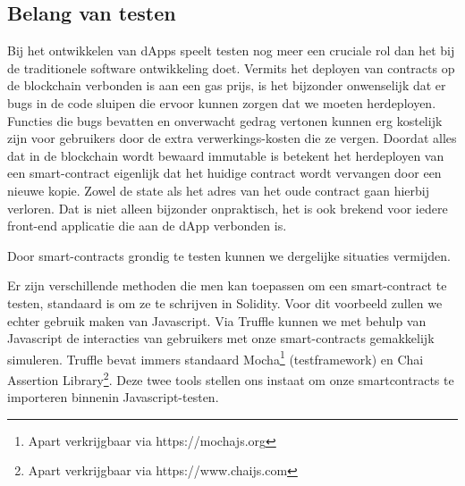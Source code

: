 	\subsection{Belang van testen}
	Bij het ontwikkelen van dApps speelt testen nog meer een cruciale rol  dan het bij de traditionele software ontwikkeling doet. Vermits het deployen van contracts op de blockchain verbonden is aan een gas prijs, is het bijzonder onwenselijk dat er bugs in de code sluipen die ervoor kunnen zorgen dat we moeten herdeployen. Functies die bugs bevatten en onverwacht gedrag vertonen kunnen erg kostelijk zijn voor gebruikers door de extra verwerkings-kosten die ze vergen. Doordat alles dat in de blockchain wordt bewaard immutable is betekent het herdeployen van een smart-contract eigenlijk dat het huidige contract wordt vervangen door een nieuwe kopie. Zowel de state als het adres van het oude contract gaan hierbij verloren. Dat is niet alleen bijzonder onpraktisch, het is ook brekend voor iedere front-end applicatie die aan de dApp verbonden is. 
	
	Door smart-contracts grondig te testen kunnen we dergelijke situaties vermijden.
	
	Er zijn verschillende methoden die men kan toepassen om een smart-contract te testen, standaard is om ze te schrijven in Solidity. Voor dit voorbeeld zullen we echter gebruik maken van Javascript. Via Truffle kunnen we met behulp van Javascript de  interacties van gebruikers met onze smart-contracts gemakkelijk simuleren. Truffle bevat immers standaard Mocha\footnote{Apart verkrijgbaar via https://mochajs.org} (testframework) en Chai Assertion Library\footnote{Apart verkrijgbaar via https://www.chaijs.com}. Deze twee tools stellen ons instaat om onze smartcontracts te importeren binnenin Javascript-testen. 
	
